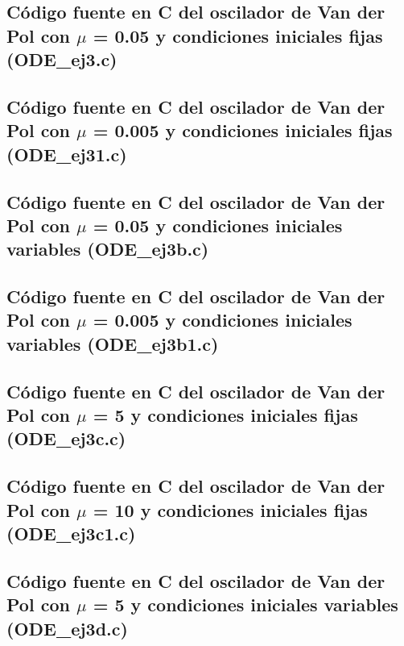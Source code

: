 \documentclass[a4paper,12pt]{article}
\begin{document}
\subsection{C\'odigo fuente en C del oscilador de Van der Pol con $\mu$ = 0.05 y condiciones iniciales fijas (ODE\_ej3.c)}




\subsection{C\'odigo fuente en C del oscilador de Van der Pol con $\mu$ = 0.005 y condiciones iniciales fijas (ODE\_ej31.c)}




\subsection{C\'odigo fuente en C del oscilador de Van der Pol con $\mu$ = 0.05 y condiciones iniciales variables (ODE\_ej3b.c)}




\subsection{C\'odigo fuente en C del oscilador de Van der Pol con $\mu$ = 0.005 y condiciones iniciales variables (ODE\_ej3b1.c)}




\subsection{C\'odigo fuente en C del oscilador de Van der Pol con $\mu$ = 5 y condiciones iniciales fijas (ODE\_ej3c.c)}



\subsection{C\'odigo fuente en C del oscilador de Van der Pol con $\mu$ = 10 y condiciones iniciales fijas (ODE\_ej3c1.c)}




\subsection{C\'odigo fuente en C del oscilador de Van der Pol con $\mu$ = 5 y condiciones iniciales variables (ODE\_ej3d.c)}
\end{document}

